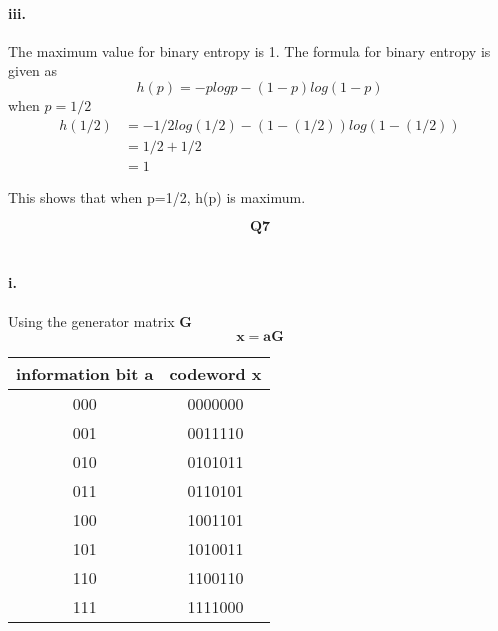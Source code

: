 \documentclass[24 pts]{article}
\begin{document}
\paragraph{iii.} The maximum value for binary entropy is 1. The formula for binary entropy is given as $$h(p)=-plogp-(1-p)log(1-p)$$
when $p=1/2$
\begin{equation*}
\begin{split}
h(1/2)&=-1/2log(1/2)-(1-(1/2))log(1-(1/2))\\
&=1/2 + 1/2\\
&=1
\end{split}
\end{equation*}

This shows that when p=1/2, h(p) is maximum.

\newpage
\[\textbf{Q7}\]\\
\paragraph{i.}Using the generator matrix \textbf{G}
$$ \mathbf{x=aG}$$
\begin{center}
\begin{tabular}{ |c|c| } 
\hline
information bit \textbf{a} & codeword \textbf{x} \\ 
 \hline
 000 & 0000000 \\ 
 001 & 0011110 \\ 
 010 & 0101011 \\ 
 011 & 0110101 \\ 
 100 & 1001101\\ 
 101 & 1010011 \\ 
 110 & 1100110 \\ 
 111 & 1111000\\ 
 \hline
\end{tabular}
\end{center}
\end{document}
